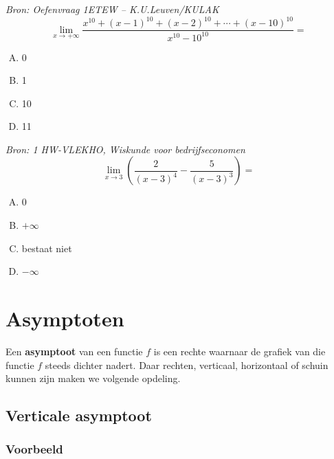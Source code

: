 \documentclass[12pt,twoside,a4paper]{article}
\begin{document}
\begin{oefening}{\em\small Bron: Oefenvraag 1ETEW -- K.U.Leuven/KULAK}\\
$$\lim_{x\to+\infty}\dfrac{x^{10}+(x-1)^{10}+(x-2)^{10}+\cdots+(x-10)^{10}}{x^{10}-10^{10}}=$$
  \begin{enumerate}[(A)]
  \itemsep1em
  \item 0
  \item 1
  \item 10
  \item 11
  \end{enumerate}
\end{oefening}

\begin{oefening}{\em\small Bron: 1 HW-VLEKHO, Wiskunde voor bedrijfseconomen}\\
$$\lim_{x\to3}\left(\dfrac{2}{\left(x-3\right)^4}-\dfrac{5}{\left(x-3\right)^3}\right)=$$
  \begin{enumerate}[(A)]
  \itemsep1em
  \item 0
  \item $+\infty$
  \item bestaat niet
  \item $-\infty$
  \end{enumerate}
\end{oefening}

\cleardoublepage
\section{Asymptoten}

Een {\bf asymptoot} van een functie $f$ is een rechte waarnaar de grafiek van die functie $f$ steeds dichter nadert. Daar rechten, verticaal, horizontaal of schuin kunnen zijn maken we volgende opdeling.

\subsection{Verticale asymptoot}

\subsubsection*{Voorbeeld}
\end{document}
